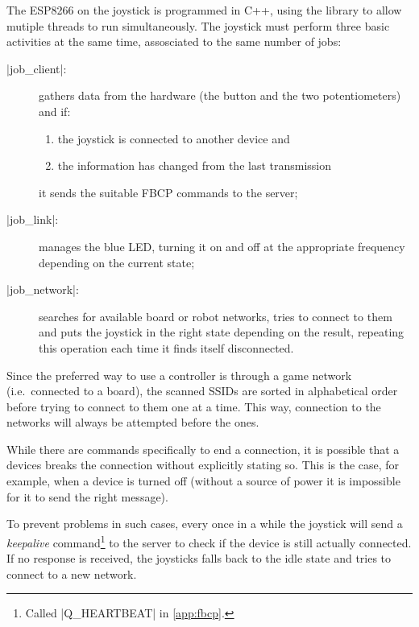 \beforelist* The ESP8266 on the joystick is programmed in C++, using the
\ScheMo{} library to allow mutiple threads to run simultaneously.
The joystick must perform three basic activities at the same time, assosciated
to the same number of jobs:
\begin{description}
  \item[\Code|job\_client|:] gathers data from the hardware (the button and the
    two potentiometers) and if:
    \begin{enumerate}[itemjoin={,}, itemjoin*={{ and }}]
      \item the joystick is connected to another device and
      \item the information has changed from the last transmission
    \end{enumerate}
    it sends the suitable FBCP commands to the server;
  \item[\Code|job\_link|:] manages the blue LED, turning it on and off at the
    appropriate frequency depending on the current state;
  \item[\Code|job\_network|:] searches for available board or robot networks,
    tries to connect to them and puts the joystick in the right state
    depending on the result, repeating this operation each time it finds itself
    disconnected.
\end{description}
\afterlist*
Since the preferred way to use a controller is through a game network
(i.e.\ connected to a board), the scanned SSIDs are sorted in alphabetical
order before trying to connect to them one at a time.
This way, connection to the  networks will always
be attempted before the  ones.

While there are commands specifically to end a connection, it is possible that
a devices breaks the connection without explicitly stating so.
This is the case, for example, when a device is turned off (without a source of
power it is impossible for it to send the right message).

To prevent problems in such cases, every once in a while the joystick will send
a \emph{keepalive} command\footnote{Called \Code|Q\_HEARTBEAT| in
\autoref{app:fbcp}.} to the server to check if the device is still actually
connected.
If no response is received, the joysticks falls back to the idle state and tries
to connect to a new network.
